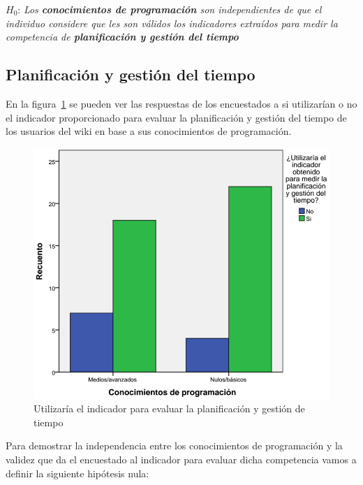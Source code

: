 \begin{mdframed}[style=hipotesis0]
$H_0$: \emph{Los \textbf{conocimientos de programación} son independientes de que el individuo considere que les son válidos los indicadores extraídos para medir la competencia de \textbf{planificación y gestión del tiempo}}
\end{mdframed}

\subsection{Planificación y gestión del tiempo}

En la figura~\ref{fig:app:barras:programacion:planificacion} se pueden ver las respuestas de los encuestados a si utilizarían o no el indicador proporcionado para evaluar la planificación y gestión del tiempo de los usuarios del wiki en base a sus conocimientos de programación.

\begin{figure}
  \begin{center}
    \includegraphics[scale=0.3]{barras_programacion_planificacion.png}
  \end{center}
  \caption{Utilizaría el indicador para evaluar la planificación y gestión de tiempo}
  \label{fig:app:barras:programacion:planificacion}
\end{figure}

Para demostrar la independencia entre los conocimientos de programación y la validez que da el encuestado al indicador para evaluar dicha competencia vamos a definir la siguiente hipótesis nula:

